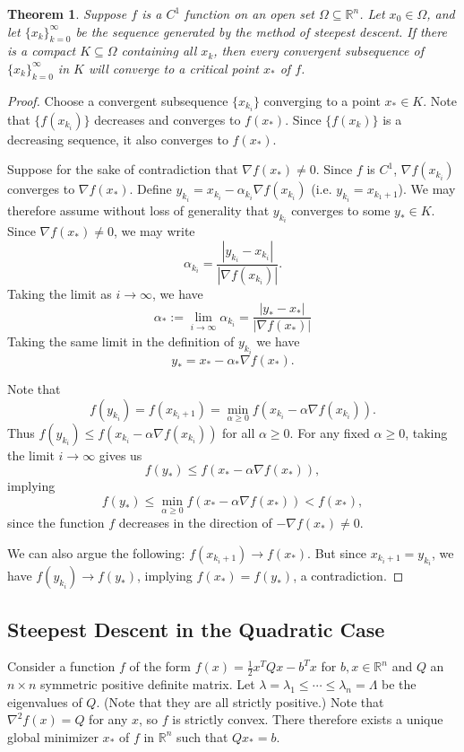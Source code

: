 \documentclass[11pt]{book}
\newcommand{\R}{\mathbb{R}}
\newtheorem{theorem}{Theorem}[subsection]
\begin{document}
\begin{theorem}
Suppose $f$ is a $C^1$ function on an open set $\Omega \subseteq \R^n$. Let $x_0 \in \Omega$, and let $\{x_k\}_{k=0}^\infty$ be the sequence generated by the method of steepest descent. If there is a compact $K \subseteq \Omega$ containing all $x_k$, then every convergent subsequence of $\{x_k\}_{k=0}^\infty$ in $K$ will converge to a critical point $x_*$ of $f$.
\end{theorem}
\begin{proof}
Choose a convergent subsequence $\{x_{k_i}\}$ converging to a point $x_* \in K$.  Note that $\{ f(x_{k_i}) \}$ decreases and converges to $f(x_*)$. Since $\{f(x_k)\}$ is a decreasing sequence, it also converges to $f(x_*)$.

Suppose for the sake of contradiction that $\nabla f(x_*) \neq 0$. Since $f$ is $C^1$, $\nabla f(x_{k_i})$ converges to $\nabla f(x_*)$. Define $y_{k_i} = x_{k_i} - \alpha_{k_i} \nabla f(x_{k_i})$ (i.e. $y_{k_i} = x_{k_1+1}$). We may therefore assume without loss of generality that $y_{k_i}$ converges to some $y_* \in K$. Since $\nabla f(x_*) \neq 0$, we may write
\[
\alpha_{k_i} = \frac{|y_{k_i} - x_{k_i}|}{|\nabla f(x_{k_i})|}.
\]
Taking the limit as $i \to \infty$, we have
\[
\alpha_* := \lim_{i \to \infty} \alpha_{k_i} = \frac{|y_* - x_*|}{|\nabla f(x_*)|}
\]
Taking the same limit in the definition of $y_{k_i}$ we have
\[
y_* = x_* - \alpha_* \nabla f(x_*).
\]

Note that
\[
f(y_{k_i}) = f(x_{k_i+1}) = \min_{\alpha \geq 0} f(x_{k_i} - \alpha \nabla f(x_{k_i})).
\]
Thus $f(y_{k_i}) \leq f(x_{k_i} - \alpha \nabla f(x_{k_i}))$ for all $\alpha \geq 0$. For any fixed $\alpha \geq 0$, taking the limit $i \to \infty$ gives us
\[
f(y_*) \leq f(x_* - \alpha \nabla f(x_*)),
\]
implying
\[
f(y_*) \leq \min_{\alpha \geq 0} f(x_* - \alpha \nabla f(x_*)) < f(x_*),
\]
since the function $f$ decreases in the direction of $-\nabla f(x_*) \neq 0$.

We can also argue the following: $f(x_{k_i+1}) \to f(x_*)$. But since $x_{k_i+1} = y_{k_i}$, we have $f(y_{k_i}) \to f(y_*)$, implying $f(x_*) = f(y_*)$, a contradiction.
\end{proof}

\subsection{Steepest Descent in the Quadratic Case}

Consider a function $f$ of the form $f(x) = \frac{1}{2}x^TQx - b^Tx$ for $b,x \in \R^n$ and $Q$ an $n \times n$ symmetric positive definite matrix. Let $\lambda = \lambda_1 \leq \cdots \leq \lambda_n = \Lambda$ be the eigenvalues of $Q$. (Note that they are all strictly positive.) Note that $\nabla^2 f(x) = Q$ for any $x$, so $f$ is strictly convex. There therefore exists a unique global minimizer $x_*$ of $f$ in $\R^n$ such that $Qx_* = b$. 
\end{document}
